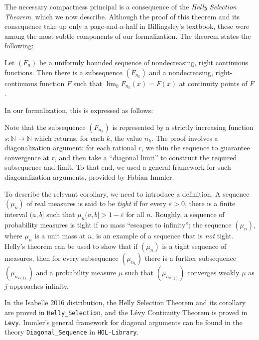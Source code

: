 \documentclass{svjour3}
\newcommand{\NN}{\mathbb{N}}
\newcommand{\todo}[1]{\fxnote{#1}}
\begin{document}
The necessary compactness principal is a consequence of the \emph{Helly Selection Theorem}, which we now describe. Although the proof of this theorem and its consequence take up only a page-and-a-half in Billingsley's textbook, these were among the most subtle components of our formalization. The theorem states the following:
\begin{theorem}
Let $(F_n)$ be a uniformly bounded sequence of nondecreasing, right continuous functions. Then there is a subsequence $(F_{n_k})$ and a nondecreasing, right-continuous function $F$ such that $\lim_k F_{n_k}(x) = F(x)$ at continuity points of $F$.  
\end{theorem}
In our formalization, this is expressed as follows:
\begin{quote}
  \todo{Insert Helly.}
\end{quote}
Note that the subsequence $(F_{n_k})$ is represented by a strictly increasing function $s : \NN \to \NN$ which returns, for each $k$, the value $n_k$. The proof involves a diagonalization argument: for each rational $r$, we thin the sequence to guarantee convergence at $r$, and then take a ``diagonal limit'' to construct the required subsequence and limit. To that end, we used a general framework for such diagonalization arguments, provided by Fabian Immler.

To describe the relevant corollary, we need to introduce a definition. A sequence $(\mu_n)$ of real measures is said to be \emph{tight} if for every $\varepsilon > 0$, there is a finite interval $(a, b]$ such that $\mu_n(a, b] > 1 - \varepsilon$ for all $n$. Roughly, a sequence of probability measures is tight if no mass ``escapes to infinity''; the sequence $(\mu_n)$, where $\mu_n$ is a unit mass at $n$, is an example of a sequence that is \emph{not} tight. Helly's theorem can be used to show that if $(\mu_n)$ is a tight sequence of measures, then for every subsequence $(\mu_{n_k})$ there is a further subsequence $(\mu_{n_{k(j)}})$ and a probability measure $\mu$ such that $(\mu_{n_{k(j)}})$ converges weakly $\mu$ as $j$ approaches infinity.
\begin{quote}
 \todo{Insert our formal version.}
\end{quote}

In the Isabelle 2016 distribution, the Helly Selection Theorem and its corollary are proved in \verb=Helly_Selection=, and the L\'evy Continuity Theorem is proved in \texttt{Levy}. Immler's general framework for diagonal arguments can be found in the theory \verb=Diagonal_Sequence= in \texttt{HOL-Library}.
\end{document}
